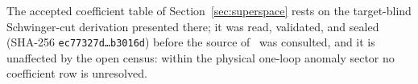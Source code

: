\begin{remark}\label{rem:ht:sealed}
The accepted coefficient table of Section~\ref{sec:superspace} rests on the
target-blind Schwinger-cut derivation presented there; it was read,
validated, and sealed (SHA-256 \texttt{ec77327d\ldots b3016d}) before the
source of~\cite{BK} was consulted, and it is unaffected by the open census:
within the physical one-loop anomaly sector no coefficient row is
unresolved.
\end{remark}
